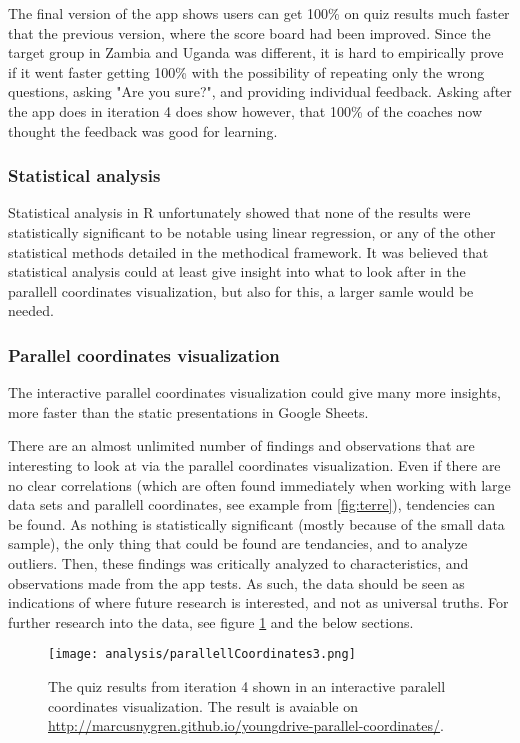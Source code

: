 The final version of the app shows users can get 100\% on quiz results much faster that the previous version, where the score board had been improved. Since the target group in Zambia and Uganda was different, it is hard to empirically prove if it went faster getting 100\% with the possibility of repeating only the wrong questions, asking "Are you sure?", and providing individual feedback. Asking after the app does in iteration 4 does show however, that 100\% of the coaches now thought the feedback was good for learning.

\subsubsection{Statistical analysis}
Statistical analysis in R unfortunately showed that none of the results were statistically significant to be notable using linear regression, or any of the other statistical methods detailed in the methodical framework. It was believed that statistical analysis could at least give insight into what to look after in the parallell coordinates visualization, but also for this, a larger samle would be needed.

\subsubsection{Parallel coordinates visualization}
The interactive parallel coordinates visualization could give many more insights, more faster than the static presentations in Google Sheets.

There are an almost unlimited number of findings and observations that are interesting to look at via the parallel coordinates visualization. Even if there are no clear correlations (which are often found immediately when working with large data sets and parallell coordinates, see example from \ref{fig:terre}), tendencies can be found. As nothing is statistically significant (mostly because of the small data sample), the only thing that could be found are tendancies, and to analyze outliers. Then, these findings was critically analyzed to characteristics, and observations made from the app tests. As such, the data should be seen as indications of where future research is interested, and not as universal truths. For further research into the data, see figure \ref{fig:parallellCoordinates3} and the below sections.

\begin{figure}[h]
    \centering
    \texttt{[image: analysis/parallellCoordinates3.png]}
    \caption{The quiz results from iteration 4 shown in an interactive paralell coordinates visualization. The result is avaiable on \url{http://marcusnygren.github.io/youngdrive-parallel-coordinates/}.}
    \label{fig:parallellCoordinates3}
\end{figure}

